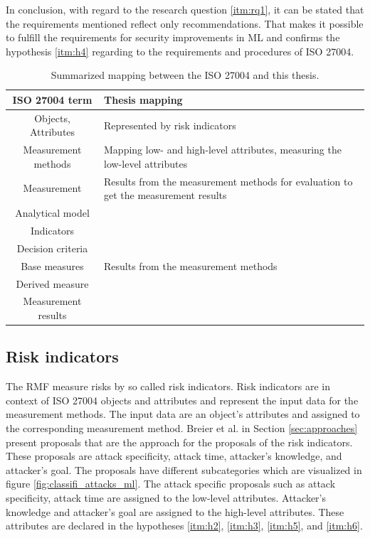 In conclusion, with regard to the research question \ref{itm:rq1}, it can be stated that the requirements mentioned reflect only recommendations. That makes it possible to fulfill the requirements for security improvements in ML and confirms the hypothesis \ref{itm:h4} regarding to the requirements and procedures of ISO 27004.

\begin{table}[h!]
\centering
  \begin{tabular}{| c | p{10cm} |}
  \hline
  \rowcolor{lightgray} ISO 27004 term & Thesis mapping \\ [0.5ex]
  \hline
  Objects, Attributes & Represented by risk indicators \\
  \hline
  Measurement methods & Mapping low- and high-level attributes, measuring the low-level attributes \\
  \hline
  Measurement & Results from the measurement methods for evaluation to get the measurement results \\
  \hline
  Analytical model & \\
  \hline
  Indicators & \\
  \hline
  Decision criteria & \\
  \hline
  Base measures & Results from the measurement methods \\
  \hline
  Derived measure & \\
  \hline
  Measurement results & \\
  \hline
  \end{tabular}
\caption{Summarized mapping between the ISO 27004 and this thesis.}
\label{tab:iso_table}
\end{table}

\subsection{Risk indicators}
\label{sec:risk_indicators}

The RMF measure risks by so called risk indicators. Risk indicators are in context of ISO 27004 \cite{ISO_27004_2009} objects and attributes and represent the input data for the measurement methods. The input data are an object's attributes and assigned to the corresponding measurement method. Breier et al. \cite{DBLP:journals/corr/abs-2012-04884} in Section \ref{sec:approaches} present
proposals that are the approach for the proposals of the risk indicators. These proposals are attack specificity, attack time, attacker's knowledge, and attacker's goal. The proposals have different subcategories which are visualized in figure \ref{fig:classifi_attacks_ml}. The attack specific proposals such as attack specificity, attack time are assigned to the low-level attributes. Attacker's knowledge and attacker's goal are assigned to the high-level attributes. These attributes are declared in the hypotheses \ref{itm:h2}, \ref{itm:h3}, \ref{itm:h5}, and \ref{itm:h6}.

